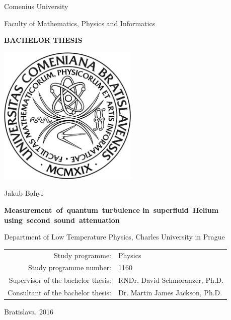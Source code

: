 \documentclass[a4paper, 12pt]{report}
\newcommand{\<}{\langle} %
\renewcommand{\>}{\rangle} %
\begin{document}
\begin{center}
{\large\sf
	Comenius University}

{\large\sf
Faculty of Mathematics, Physics and Informatics}
\bigskip

{\Large \bfseries \sffamily BACHELOR THESIS}
\vspace*{1cm}



\includegraphics[width=0.5\textwidth]{graphics/fmfi_logo.jpg} 

\vfill
\vspace{5mm}

{\LARGE\sf Jakub Bahyl}

\vspace{10mm}

{\LARGE \bfseries \sffamily
\mbox{Measurement of quantum turbulence}
\mbox{in superfluid Helium}
\mbox{using second sound attenuation}
}

\vfill

Department of Low Temperature Physics, Charles University in Prague

\vfill

\begin{tabular}{rl}

Study programme: & Physics \\
\noalign{\vspace{2mm}}
Study programme number: & 1160 \\
\noalign{\vspace{2mm}}
Supervisor of the bachelor thesis: & RNDr. David Schmoranzer, Ph.D. \\
\noalign{\vspace{2mm}}
Consultant of the bachelor thesis: & Dr. Martin James Jackson, Ph.D. \\

\end{tabular}

\vfill


{\Large\sf Bratislava, 2016}





\end{center}
\end{document}
